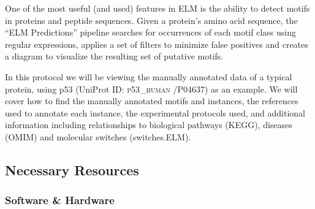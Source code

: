 \documentclass[12pt]{article}
\newcounter{proto}
\newcommand\uniprot[1]{%
	\textsc{\lowercase{#1}}%
}
\begin{document}
One of the most useful (and used) features in ELM is the ability to
detect motifs in proteins and peptide sequences. Given a protein's amino acid
sequence, the ``ELM Predictions'' pipeline searches for occurrences of
each motif class using regular expressions, applies a set of filters to
minimize false positives and creates a diagram to visualize the resulting
set of putative motifs.

In this protocol we will be viewing the manually annotated data of a
typical protein, using p53 (UniProt ID: \uniprot{P53\_HUMAN}/P04637) as an
example. We will cover how to find the manually annotated motifs and instances,
the references used to annotate each
instance, the experimental protocols used, and additional information including
relationships to biological pathways (KEGG), diseases (OMIM) and molecular
switches (switches.ELM).

%
%
\subsection*{Necessary Resources}
\subsubsection*{Software \& Hardware}

\end{document}
